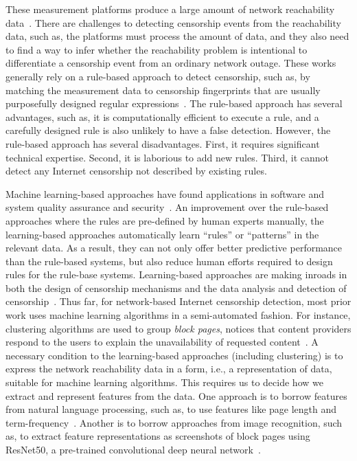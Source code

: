 These measurement platforms produce a large amount of network
reachability data~\cite{sundara_raman_censored_2020, niaki2020iclab}.  There
are challenges to detecting censorship events from the reachability data, such as,
the platforms must process the amount of data, and they also need to find a way
to infer whether the reachability problem is intentional to differentiate a
censorship event from an ordinary network outage.  These works generally rely on a
rule-based approach to detect censorship, such as, by matching the measurement
data to censorship fingerprints that are usually purposefully designed regular
expressions~\cite{sundara_raman_censored_2020, niaki2020iclab}. The rule-based
approach has several advantages, such as, it is computationally efficient to
execute a rule, and a carefully designed rule is also unlikely to have a false
detection. However, the rule-based approach has several disadvantages. First,
it requires significant technical expertise.  Second, it is laborious to add
new rules.  Third, it cannot detect any Internet censorship not described by
existing rules. 

Machine learning-based approaches have found applications in software and
system quality assurance and security~\cite{qiao2020deep, lin2020software}.
An improvement over the rule-based approaches where the rules are pre-defined by human
experts manually, the learning-based approaches automatically learn ``rules''
or ``patterns'' in the relevant data. As a result, they can not only offer
better predictive performance than the rule-based systems, but also reduce
human efforts required to design rules for the rule-base systems.
Learning-based approaches are making inroads in both the design of censorship
mechanisms and the data analysis and detection of
censorship~\cite{gao2021machine, li2015predicting}.  Thus far, for
network-based Internet censorship detection, most prior work uses machine
learning algorithms in a semi-automated fashion. For instance, clustering
algorithms are used to group {\em block pages}, notices that content providers
respond to the users to explain the unavailability of requested
content~\cite{jones2014automated}.  A necessary condition to the learning-based
approaches (including clustering) is to express the network reachability data in
a form, i.e., a representation of data, suitable for machine learning
algorithms. This requires us to decide how we extract and represent features
from the data. One approach is to borrow features from natural language
processing, such as, to use features like page length and
term-frequency~\cite{jones2014automated, niaki2020iclab}.  Another is to borrow
approaches from image recognition, such as, to extract feature representations
as screenshots of block pages using ResNet50, a pre-trained convolutional deep
neural network~\cite{raman_measuring_2020}.

